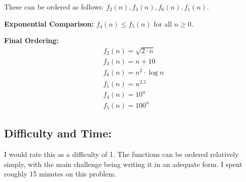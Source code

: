 \documentclass{article}
\begin{document}
\noindent These can be ordered as follows:  $f_2(n), f_3(n), f_6(n), f_1(n)$.
\newline

\noindent \textbf{Exponential Comparison:}
$f_4(n) \leq f_5(n)$ for all $n \geq 0$.
\newline

\noindent \textbf{Final Ordering:}
\newline
\begin{align*}
&f_2(n) = \sqrt{2 \cdot n} \\
&f_3(n) = n + 10 \\
&f_6(n) = n^2 \cdot \log{n} \\
&f_1(n) = n^{2.5} \\
&f_4(n) = 10^n \\
&f_5(n) = 100^n
\end{align*}
 
\subsection*{Difficulty and Time:}
I would rate this as a difficulty of 1.  The functions can be ordered relatively simply, with the main challenge being writing it in an adequate form.  I spent roughly 15 minutes on this problem.
\end{document}
